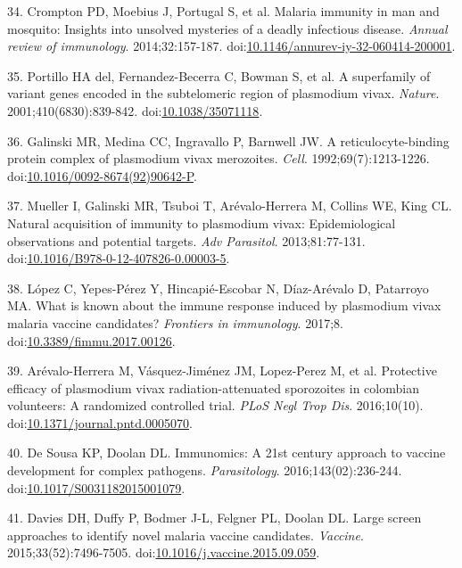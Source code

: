 \documentclass[a4paper]{article}
\begin{document}
\hypertarget{ref-crompton2014rev}{}
34. Crompton PD, Moebius J, Portugal S, et al. Malaria immunity in man
and mosquito: Insights into unsolved mysteries of a deadly infectious
disease. \emph{Annual review of immunology}. 2014;32:157-187.
doi:\href{https://doi.org/10.1146/annurev-iy-32-060414-200001}{10.1146/annurev-iy-32-060414-200001}.

\hypertarget{ref-portillo2001vir}{}
35. Portillo HA del, Fernandez-Becerra C, Bowman S, et al. A superfamily
of variant genes encoded in the subtelomeric region of plasmodium vivax.
\emph{Nature}. 2001;410(6830):839-842.
doi:\href{https://doi.org/10.1038/35071118}{10.1038/35071118}.

\hypertarget{ref-galinski1992rbp}{}
36. Galinski MR, Medina CC, Ingravallo P, Barnwell JW. A
reticulocyte-binding protein complex of plasmodium vivax merozoites.
\emph{Cell}. 1992;69(7):1213-1226.
doi:\href{https://doi.org/10.1016/0092-8674(92)90642-P}{10.1016/0092-8674(92)90642-P}.

\hypertarget{ref-mueller2013}{}
37. Mueller I, Galinski MR, Tsuboi T, Arévalo-Herrera M, Collins WE,
King CL. Natural acquisition of immunity to plasmodium vivax:
Epidemiological observations and potential targets. \emph{Adv
Parasitol}. 2013;81:77-131.
doi:\href{https://doi.org/10.1016/B978-0-12-407826-0.00003-5}{10.1016/B978-0-12-407826-0.00003-5}.

\hypertarget{ref-lopez2017}{}
38. López C, Yepes-Pérez Y, Hincapié-Escobar N, Díaz-Arévalo D,
Patarroyo MA. What is known about the immune response induced by
plasmodium vivax malaria vaccine candidates? \emph{Frontiers in
immunology}. 2017;8.
doi:\href{https://doi.org/10.3389/fimmu.2017.00126}{10.3389/fimmu.2017.00126}.

\hypertarget{ref-arevalo2016spz}{}
39. Arévalo-Herrera M, Vásquez-Jiménez JM, Lopez-Perez M, et al.
Protective efficacy of plasmodium vivax radiation-attenuated sporozoites
in colombian volunteers: A randomized controlled trial. \emph{PLoS Negl
Trop Dis}. 2016;10(10).
doi:\href{https://doi.org/10.1371/journal.pntd.0005070}{10.1371/journal.pntd.0005070}.

\hypertarget{ref-immunomics2016}{}
40. De Sousa KP, Doolan DL. Immunomics: A 21st century approach to
vaccine development for complex pathogens. \emph{Parasitology}.
2016;143(02):236-244.
doi:\href{https://doi.org/10.1017/S0031182015001079}{10.1017/S0031182015001079}.

\hypertarget{ref-Davies2015Large}{}
41. Davies DH, Duffy P, Bodmer J-L, Felgner PL, Doolan DL. Large screen
approaches to identify novel malaria vaccine candidates. \emph{Vaccine}.
2015;33(52):7496-7505.
doi:\href{https://doi.org/10.1016/j.vaccine.2015.09.059}{10.1016/j.vaccine.2015.09.059}.
\end{document}
